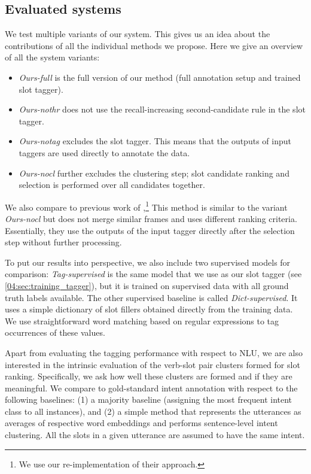 \subsection{Evaluated systems}
We test multiple variants of our system.
This gives us an idea about the contributions of all the individual methods we propose.
Here we give an overview of all the system variants:
\begin{itemize}[nosep,leftmargin=10pt]
    \item \textit{Ours-full} is the full version of our method (full annotation setup and trained slot tagger).
    \item \textit{Ours-nothr} does not use the recall-increasing second-candidate rule in the slot tagger.
    \item \textit{Ours-notag} excludes the slot tagger. This means that the outputs of input taggers are used directly to annotate the data.
    \item \textit{Ours-nocl} further excludes the clustering step; slot candidate ranking and selection is performed over all candidates together.
\end{itemize}
We also compare to previous work of \citet{chen2014leveraging},\footnote{We use our re-implementation of their approach.}
This method is similar to the variant \textit{Ours-nocl} but does not merge similar frames and uses different ranking criteria.
Essentially, they use the outputs of the input tagger directly after the selection step without further processing.

To put our results into perspective, we also include two supervised models for comparison:
\emph{Tag-supervised} is the same model that we use as our slot tagger (see \ref{04:sec:training_tagger}), but it is trained on supervised data with all ground truth labels available.
The other supervised baseline is called \emph{Dict-supervised}.
It uses a simple dictionary of slot fillers obtained directly from the training data.
We use straightforward word matching based on regular expressions to tag occurrences of these values.

Apart from evaluating the tagging performance with respect to NLU, we are also interested in the intrinsic evaluation of the verb-slot pair clusters formed for slot ranking.
Specifically, we ask how well these clusters are formed and if they are meaningful.
We compare to gold-standard intent annotation with respect to the following baselines: (1) a majority baseline (assigning the most frequent intent class to all instances), and (2) a simple method that represents the utterances as averages of respective word embeddings and performs sentence-level intent clustering.
All the slots in a given utterance are assumed to have the same intent.


